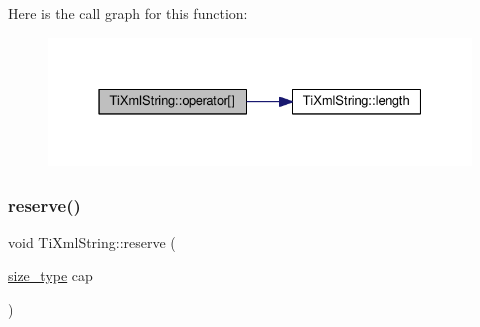 Here is the call graph for this function\+:
\nopagebreak
\begin{figure}[H]
\begin{center}
\leavevmode
\includegraphics[width=331pt]{class_ti_xml_string_a06e8c84831fc146610369405f4aa4200_cgraph}
\end{center}
\end{figure}
\mbox{\label{class_ti_xml_string_a88ecf9f0f00cb5c67b6b637958d7049c}} 
\subsubsection{\texorpdfstring{reserve()}{reserve()}}
{\footnotesize\ttfamily void Ti\+Xml\+String\+::reserve (\begin{DoxyParamCaption}\item[{\hyperlink{class_ti_xml_string_abeb2c1893a04c17904f7c06546d0b971}{size\+\_\+type}}]{cap }\end{DoxyParamCaption})}

